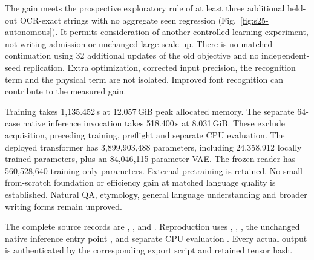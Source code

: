The gain meets the prospective exploratory rule of at least three additional
held-out OCR-exact strings with no aggregate seen regression
(Fig.~\ref{fig:s25-autonomous}). It permits consideration of another controlled
learning experiment, not writing admission or unchanged large scale-up.
There is no matched continuation using 32 additional updates of the old
objective and no independent-seed replication. Extra optimization, corrected
input precision, the recognition term and the physical term are not isolated.
Improved font recognition can contribute to the measured gain.

Training takes 1,135.452\,s at 12.057\,GiB peak allocated memory. The separate
64-case native inference invocation takes 518.400\,s at 8.031\,GiB. These
exclude acquisition, preceding training, preflight and separate CPU evaluation.
The deployed transformer has 3,899,903,488 parameters, including 24,358,912
locally trained parameters, plus an 84,046,115-parameter VAE. The frozen reader
has 560,528,640 training-only parameters. External pretraining is retained.
No small from-scratch foundation or efficiency gain at matched language
quality is established. Natural QA, etymology, general language understanding
and broader writing forms remain unproved.

The complete source records are
,
,
and .
Reproduction uses ,
,
, the unchanged native inference
entry point , and separate CPU
evaluation . Every actual output is
authenticated by the corresponding export script and retained tensor hash.

\clearpage
{}
